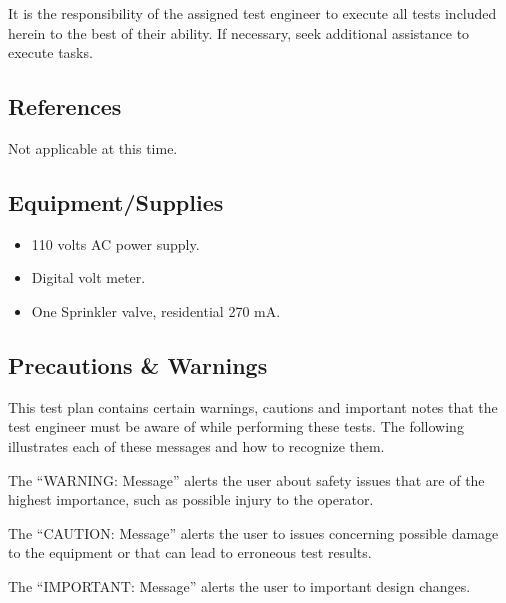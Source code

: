 \documentclass{article}
\begin{document}
It is the responsibility of the assigned test engineer to execute all tests
included herein to the best of their ability. If necessary, seek additional
assistance to execute tasks.

\subsection{References}

Not applicable at this time.


\subsection{Equipment/Supplies}

\begin{itemize}
\item 110 volts AC power supply.
\item Digital volt meter.
\item One Sprinkler valve, residential 270 mA.
\end{itemize}

\subsection{Precautions \& Warnings}

This test plan contains certain warnings, cautions and important
notes that the test engineer must be aware of while performing these tests.
The following illustrates each of these messages and how to recognize them.


The ``WARNING: Message'' alerts the user about safety issues that are of
the highest importance, such as possible injury to the operator.


The ``CAUTION: Message'' alerts the user to issues concerning possible
damage to the equipment or that can lead to erroneous test results.


The ``IMPORTANT: Message'' alerts the user to important design changes.
\end{document}
